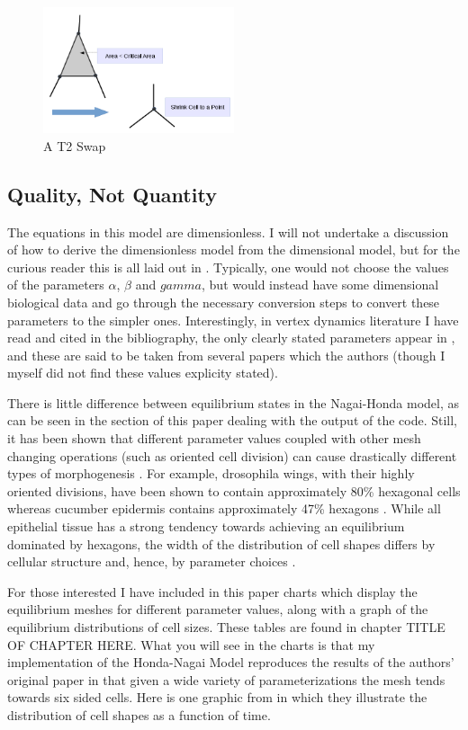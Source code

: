 \begin{figure}
\centering
\includegraphics[width=0.5\textwidth]{../diagrams/T2swap.png}
\caption{A T2 Swap}
\label{fig:t2}
\end{figure}

\subsection{Quality, Not Quantity}

The equations in this model are dimensionless. I will not undertake a discussion of how to derive the dimensionless model from the dimensional model, but for the curious reader this is all laid out in \cite{HondaNagai}. Typically, one would not choose the values of the parameters $\alpha$, $\beta$ and $gamma$, but would instead have some dimensional biological data and go through the necessary conversion steps to convert these parameters to the simpler ones. Interestingly, in vertex dynamics literature I have read and cited in the bibliography, the only clearly stated parameters appear in \cite{ChasteMain}, and these are said to be taken from several papers which the authors (though I myself did not find these values explicity stated).  

There is little difference between equilibrium states in the Nagai-Honda model, as can be seen in the section of this paper dealing with the output of the code. Still, it has been shown that different parameter values coupled with other mesh changing operations (such as oriented cell division) can cause drastically different types of morphogenesis \cite{Overview}. For example, drosophila wings, with their highly oriented divisions, have been shown to contain approximately 80\% hexagonal cells whereas cucumber epidermis contains approximately 47\% hexagons \cite{Epithelial Topology}. While all epithelial tissue has a strong tendency towards achieving an equilibrium dominated by hexagons, the width of the distribution of cell shapes differs by cellular structure and, hence, by parameter choices \cite{Soap}. 

For those interested I have included in this paper charts which display the equilibrium meshes for different parameter values, along with a graph of the equilibrium distributions of cell sizes. These tables are found in chapter TITLE OF CHAPTER HERE. What you will see in the charts is that my implementation of the Honda-Nagai Model reproduces the results of the authors' original paper in that given a wide variety of parameterizations the mesh tends towards six sided cells. Here is one graphic from \cite{HondaNagai} in which they illustrate the distribution of cell shapes as a function of time. 

